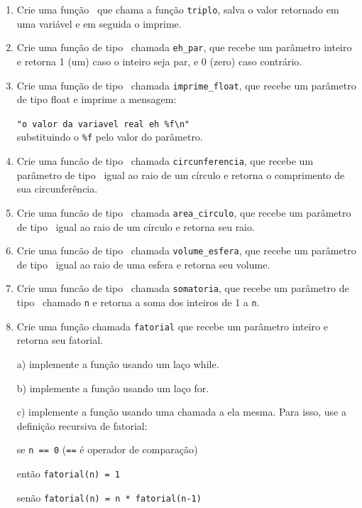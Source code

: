 \begin{enumerate}
    \item Crie uma função \MAIN\ que chama a função {\tt triplo}, salva o valor retornado em uma variável e em seguida o imprime.

    \item Crie uma função de tipo \INT\ chamada \verb|eh_par|, que recebe um parâmetro inteiro e retorna 1 (um) caso o inteiro seja par, e 0 (zero) caso contrário.

    \item Crie uma função de tipo \VOID\ chamada \verb|imprime_float|, que recebe um parâmetro de tipo float e imprime a mensagem:

\verb|"o valor da variavel real eh %f\n"|
\\
substituindo o \verb|%f| pelo valor do parâmetro.

    \item Crie uma funcão de tipo \FLOAT\ chamada \verb|circunferencia|, que recebe um parâmetro de tipo \FLOAT\ igual ao raio de um círculo e retorna o comprimento de sua circunferência.

    \item Crie uma funcão de tipo \FLOAT\ chamada \verb|area_circulo|, que recebe um parâmetro de tipo \FLOAT\ igual ao raio de um círculo e retorna seu raio.

    \item Crie uma funcão de tipo \FLOAT\ chamada \verb|volume_esfera|, que recebe um parâmetro de tipo \FLOAT\ igual ao raio de uma esfera e retorna seu volume.

    \item Crie uma funcão de tipo \INT\ chamada \verb|somatoria|, que recebe um parâmetro de tipo \INT\ chamado {\tt n} e retorna a soma dos inteiros de 1 a {\tt n}.

    \item Crie uma função chamada {\tt fatorial} que recebe um parâmetro inteiro e retorna seu fatorial.

	a) implemente a função usando um laço while.

	b) implemente a função usando um laço for.

	c) implemente a função usando uma chamada a ela mesma. Para isso, use a definição recursiva de fatorial:

		se {\tt n == 0} ({\tt ==} é operador de comparação) 

então {\tt fatorial(n) = 1}

		senão {\tt fatorial(n) = n * fatorial(n-1)}


\end{enumerate}
